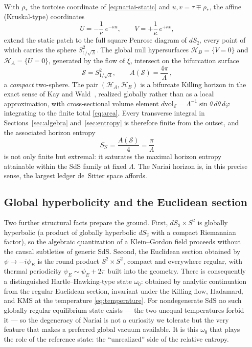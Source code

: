 \documentclass[11pt]{article}
\newcommand{\Nariai}{Nariai}
\begin{document}
With $\rho_*$ the tortoise coordinate of \eqref{eq:nariai-static} and $u,v = \tau \mp \rho_*$, the affine (Kruskal-type) coordinates
\begin{equation}
U = -\frac{1}{\kappa}\,e^{-\kappa u},
\qquad
V = +\frac{1}{\kappa}\,e^{+\kappa v},
\end{equation}
extend the static patch to the full square Penrose diagram of $dS_2$, every point of which carries the sphere $S^2_{1/\sqrt{\Lambda}}$. The global null hypersurfaces $\mathcal{H}_B = \{V = 0\}$ and $\mathcal{H}_A = \{U = 0\}$, generated by the flow of $\xi$, intersect on the bifurcation surface
\begin{equation}
\mathcal{S} = S^2_{1/\sqrt{\Lambda}},
\qquad
A(\mathcal{S}) = \frac{4\pi}{\Lambda}\,,
\label{eq:area}
\end{equation}
a \emph{compact} two-sphere. The pair $(\mathcal{H}_A, \mathcal{H}_B)$ is a bifurcate Killing horizon in the exact sense of Kay and Wald~\cite{KayWald}, realized globally rather than as a local approximation, with cross-sectional volume element $d\mathrm{vol}_{\mathcal{S}} = \Lambda^{-1}\sin\theta\, d\theta\, d\varphi$ integrating to the finite total \eqref{eq:area}. Every transverse integral in Sections~\ref{sec:algebra} and~\ref{sec:entropy} is therefore finite from the outset, and the associated horizon entropy
\begin{equation}
S_{\mathrm{N}} = \frac{A(\mathcal{S})}{4} = \frac{\pi}{\Lambda}
\label{eq:Smax}
\end{equation}
is not only finite but extremal: it saturates the maximal horizon entropy attainable within the SdS family at fixed $\Lambda$. The \Nariai{} horizon is, in this precise sense, the largest ledger de~Sitter space affords.

\subsection{Global hyperbolicity and the Euclidean section}

Two further structural facts prepare the ground. First, $dS_2 \times S^2$ is globally hyperbolic (a product of globally hyperbolic $dS_2$ with a compact Riemannian factor), so the algebraic quantization of a Klein--Gordon field proceeds without the causal subtleties of generic SdS. Second, the Euclidean section obtained by $\psi \to -i\psi_E$ is the round product $S^2 \times S^2$, compact and everywhere regular, with thermal periodicity $\psi_E \sim \psi_E + 2\pi$ built into the geometry. There is consequently a distinguished Hartle--Hawking-type state $\omega_0$: obtained by analytic continuation from the regular Euclidean section, invariant under the Killing flow, Hadamard, and KMS at the temperature \eqref{eq:temperature}. For nondegenerate SdS no such globally regular equilibrium state exists --- the two unequal temperatures forbid it --- so the degeneracy of \Nariai{} is not a curiosity we tolerate but the very feature that makes a preferred global vacuum available. It is this $\omega_0$ that plays the role of the reference state: the ``unrealized'' side of the relative entropy.
\end{document}
